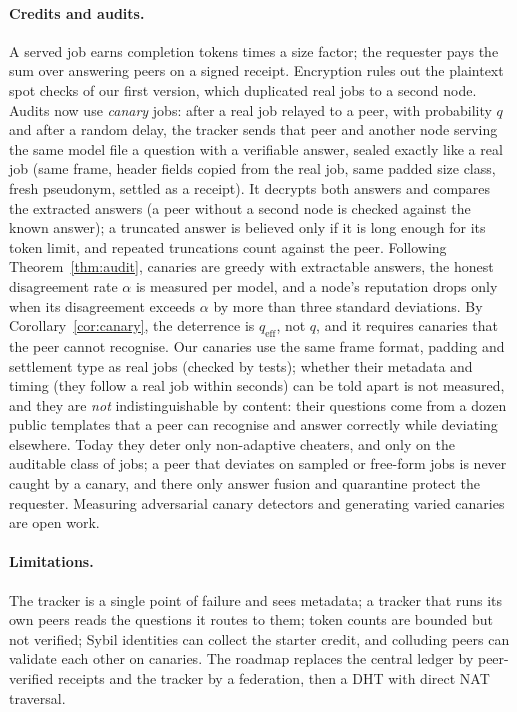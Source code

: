 \documentclass[11pt]{article}
\theoremstyle{definition}
\theoremstyle{remark}
\begin{document}
\paragraph{Credits and audits.} A served job earns completion tokens times a size factor; the requester pays
the sum over answering peers on a signed receipt. Encryption rules out the plaintext spot checks of our
first version, which duplicated real jobs to a second node. Audits now use \emph{canary} jobs: after a real
job relayed to a peer, with probability $q$ and after a random delay, the tracker sends that peer and
another node serving the same model file a question with a verifiable answer, sealed exactly like a real
job (same frame, header fields copied from the real job, same padded size class, fresh pseudonym, settled
as a receipt). It decrypts both answers and compares the extracted answers (a peer without a second node is checked
against the known answer); a truncated answer is believed only if it is long enough for its token limit,
and repeated truncations count against the peer. Following Theorem~\ref{thm:audit}, canaries are greedy with extractable answers, the honest
disagreement rate $\alpha$ is measured per model, and a node's reputation drops only when its disagreement
exceeds $\alpha$ by more than three standard deviations. By Corollary~\ref{cor:canary}, the deterrence is
$q_{\mathrm{eff}}$, not $q$, and it requires canaries that the peer cannot recognise. Our canaries use the same frame format, padding and settlement type as real jobs (checked by tests);
whether their metadata and timing (they follow a real job within seconds) can be told apart is not
measured, and they are \emph{not} indistinguishable by content: their questions come from a dozen public templates that a peer can recognise and answer correctly
while deviating elsewhere. Today they deter only non-adaptive cheaters, and only on the auditable class of
jobs; a peer that deviates on sampled or free-form jobs is never caught by a canary, and there only answer
fusion and quarantine protect the requester. Measuring adversarial canary detectors and generating
varied canaries are open work.
\paragraph{Limitations.} The tracker is a single point of failure and sees metadata; a tracker that runs
its own peers reads the questions it routes to them; token counts are bounded but not verified; Sybil
identities can collect the starter credit, and colluding peers can validate each other on canaries. The
roadmap replaces the central ledger by peer-verified receipts and the tracker by a federation, then a DHT
with direct NAT traversal.
\end{document}

